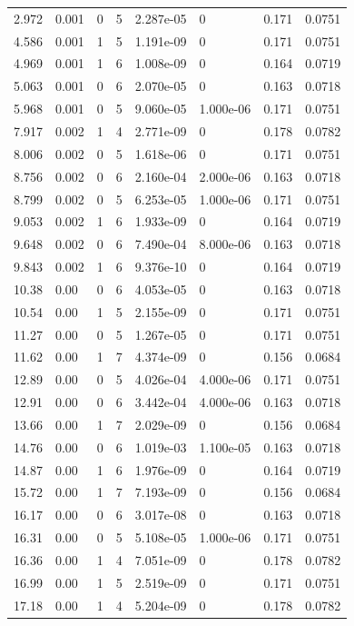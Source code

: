 \documentclass[preview]{standalone}
\begin{document}
{{\begin{tabular}{L{1.2cm}C{1.2cm} C{0.3cm}C{0.5cm} C{1.4cm}C{1.4cm} C{1.4cm}C{1.4cm}}
  2.972  &  0.001  & 0     &  5 &  2.287e-05  & 0  & 0.171 &  0.0751   \\ 
  4.586  &  0.001  & 1     &  5 &  1.191e-09  & 0  & 0.171 &  0.0751   \\ 
  4.969  &  0.001  & 1     &  6 &  1.008e-09  & 0  & 0.164 &  0.0719   \\ 
  5.063  &  0.001  & 0     &  6 &  2.070e-05  & 0  & 0.163 &  0.0718   \\ 
  5.968  &  0.001  & 0     &  5 &  9.060e-05  & 1.000e-06  & 0.171 &  0.0751   \\ 
  7.917  &  0.002  & 1     &  4 &  2.771e-09  & 0  & 0.178 &  0.0782   \\ 
  8.006  &  0.002  & 0     &  5 &  1.618e-06  & 0  & 0.171 &  0.0751   \\ 
  8.756  &  0.002  & 0     &  6 &  2.160e-04  & 2.000e-06  & 0.163 &  0.0718   \\ 
  8.799  &  0.002  & 0     &  5 &  6.253e-05  & 1.000e-06  & 0.171 &  0.0751   \\ 
  9.053  &  0.002  & 1     &  6 &  1.933e-09  & 0  & 0.164 &  0.0719   \\ 
  9.648  &  0.002  & 0     &  6 &  7.490e-04  & 8.000e-06  & 0.163 &  0.0718   \\ 
  9.843  &  0.002  & 1     &  6 &  9.376e-10  & 0  & 0.164 &  0.0719   \\ 
  10.38  &  0.00  & 0     &  6 &  4.053e-05  & 0  & 0.163 &  0.0718   \\ 
  10.54  &  0.00  & 1     &  5 &  2.155e-09  & 0  & 0.171 &  0.0751   \\ 
  11.27  &  0.00  & 0     &  5 &  1.267e-05  & 0  & 0.171 &  0.0751   \\ 
  11.62  &  0.00  & 1     &  7 &  4.374e-09  & 0  & 0.156 &  0.0684   \\ 
  12.89  &  0.00  & 0     &  5 &  4.026e-04  & 4.000e-06  & 0.171 &  0.0751   \\ 
  12.91  &  0.00  & 0     &  6 &  3.442e-04  & 4.000e-06  & 0.163 &  0.0718   \\ 
  13.66  &  0.00  & 1     &  7 &  2.029e-09  & 0  & 0.156 &  0.0684   \\ 
  14.76  &  0.00  & 0     &  6 &  1.019e-03  & 1.100e-05  & 0.163 &  0.0718   \\ 
  14.87  &  0.00  & 1     &  6 &  1.976e-09  & 0  & 0.164 &  0.0719   \\ 
  15.72  &  0.00  & 1     &  7 &  7.193e-09  & 0  & 0.156 &  0.0684   \\ 
  16.17  &  0.00  & 0     &  6 &  3.017e-08  & 0  & 0.163 &  0.0718   \\ 
  16.31  &  0.00  & 0     &  5 &  5.108e-05  & 1.000e-06  & 0.171 &  0.0751   \\ 
  16.36  &  0.00  & 1     &  4 &  7.051e-09  & 0  & 0.178 &  0.0782   \\ 
  16.99  &  0.00  & 1     &  5 &  2.519e-09  & 0  & 0.171 &  0.0751   \\ 
  17.18  &  0.00  & 1     &  4 &  5.204e-09  & 0  & 0.178 &  0.0782   \\ 
\hline 
\end{tabular} 

}}
\end{document}
